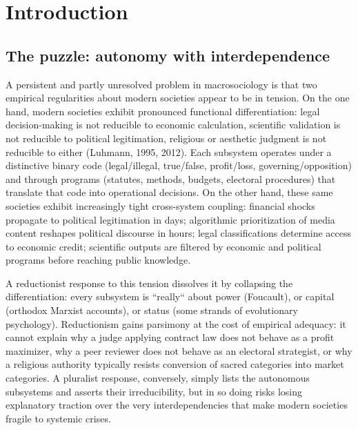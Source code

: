 \documentclass[12pt,a4paper]{article}
\begin{document}
\begin{abstract}
it is compared systematically with world-systems theory, neo-institutionalism, network/complexity science, and analytical sociology.

\bigskip
\noindent\textbf{Keywords:} functional differentiation; structural coupling; emergence; critical realism; Coleman boat; relational models; surveillance capitalism; agent-based modeling.
\end{abstract}

\newpage
\tableofcontents
\newpage

\section{Introduction}

\subsection{The puzzle: autonomy with interdependence}

A persistent and partly unresolved problem in macrosociology is that two empirical regularities about modern societies appear to be in tension. On the one hand, modern societies exhibit pronounced functional differentiation: legal decision-making is not reducible to economic calculation, scientific validation is not reducible to political legitimation, religious or aesthetic judgment is not reducible to either (Luhmann, 1995, 2012). Each subsystem operates under a distinctive binary code (legal/illegal, true/false, profit/loss, governing/opposition) and through programs (statutes, methods, budgets, electoral procedures) that translate that code into operational decisions. On the other hand, these same societies exhibit increasingly tight cross-system coupling: financial shocks propagate to political legitimation in days; algorithmic prioritization of media content reshapes political discourse in hours; legal classifications determine access to economic credit; scientific outputs are filtered by economic and political programs before reaching public knowledge.


A reductionist response to this tension dissolves it by collapsing the differentiation: every subsystem is ``really`` about power (Foucault), or capital (orthodox Marxist accounts), or status (some strands of evolutionary psychology). Reductionism gains parsimony at the cost of empirical adequacy: it cannot explain why a judge applying contract law does not behave as a profit maximizer, why a peer reviewer does not behave as an electoral strategist, or why a religious authority typically resists conversion of sacred categories into market categories. A pluralist response, conversely, simply lists the autonomous subsystems and asserts their irreducibility, but in so doing risks losing explanatory traction over the very interdependencies that make modern societies fragile to systemic crises.
\end{document}
